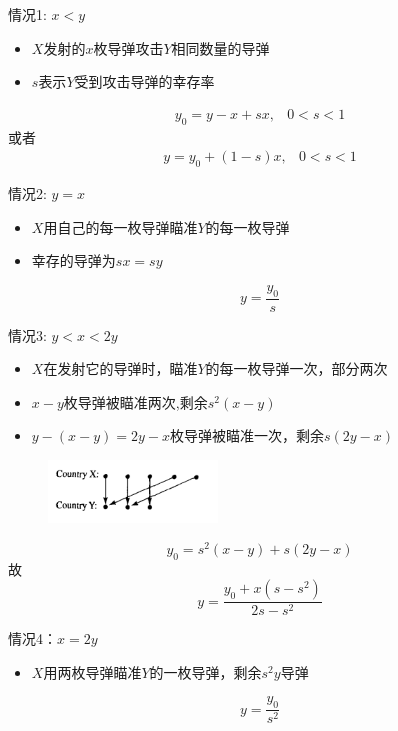 \documentclass[mathserif, table]{beamer}
\begin{document}
\begin{frame}{情况1: $x < y$}
  \begin{itemize}
  \item $X$发射的$x$枚导弹攻击$Y$相同数量的导弹
  \item $s$表示$Y$受到攻击导弹的幸存率
  \end{itemize}
  \[
  \begin{array}{cc}
    y_0 = y - x + sx, & 0 < s < 1
  \end{array}
  \]
  或者
  \[
  \begin{array}{cc}
    y = y_0 +(1-s)x, & 0 < s < 1
  \end{array}
  \]
\end{frame}

\begin{frame}{情况2: $y = x$}
  \begin{itemize}
  \item $X$用自己的每一枚导弹瞄准$Y$的每一枚导弹
  \item 幸存的导弹为$sx = sy$
  \end{itemize}

  \[
  y = \frac{y_0}{s}
  \]
  
\end{frame}

\begin{frame}{情况3: $y < x < 2y$}
  \begin{itemize}
  \item $X$在发射它的导弹时，瞄准$Y$的每一枚导弹一次，部分两次
  \item $x-y$枚导弹被瞄准两次,剩余$s^2(x-y)$
  \item $y-(x-y) = 2y-x$枚导弹被瞄准一次，剩余$s(2y-x)$
  \end{itemize}
  
  \begin{figure}
    \centering
    \includegraphics[width=0.4\textwidth]{neardouble.png}
  \end{figure}
  
  \[
  y_0 = s^2(x-y) + s(2y-x)
  \]
  故
  \[
  y = \frac{y_0 + x(s-s^2)}{2s - s^2}
  \]
\end{frame}

\begin{frame}{情况4：$x=2y$}
  \begin{itemize}
  \item $X$用两枚导弹瞄准$Y$的一枚导弹，剩余$s^2y$导弹
  \end{itemize}
  \[
  y = \frac{y_0}{s^2}
  \]

\end{frame}
\end{document}
